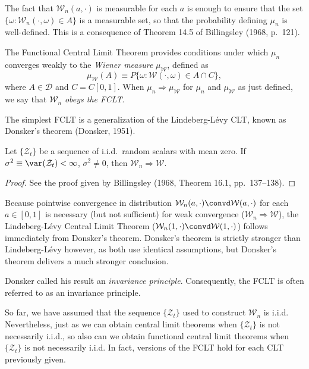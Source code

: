 The fact that $\mathcal{W}_n(a, \cdot)$ is measurable for each $a$ is enough to ensure that the set $\{\omega : \mathcal{W}_n(\cdot, \omega) \in A\}$ is a measurable set, so that the probability defining $\mu_n$ is well-defined. This is a consequence of Theorem 14.5 of Billingsley (1968, p.\ 121).

The Functional Central Limit Theorem provides conditions under which $\mu_n$ converges weakly to the \emph{Wiener measure} $\mu_{\mathcal{W}}$, defined as
\[
\mu_{\mathcal{W}}(A) \equiv P\{\omega : \mathcal{W}(\cdot, \omega) \in A \cap C\},
\]
where $A \in \mathcal{D}$ and $C = C[0,1]$. When $\mu_n \Rightarrow \mu_{\mathcal{W}}$ for $\mu_n$ and $\mu_{\mathcal{W}}$ as just defined, we say that $\mathcal{W}_n$ \emph{obeys the FCLT}.

The simplest FCLT is a generalization of the Lindeberg-L\'{e}vy CLT, known as Donsker's theorem (Donsker, 1951).

\begin{theorem}[Donsker]\label{thm:donsker}
Let $\{\mathcal{Z}_t\}$ be a sequence of i.i.d.\ random scalars with mean zero. If $\sigma^2 \equiv \var(\mathcal{Z}_t) < \infty$, $\sigma^2 \neq 0$, then $\mathcal{W}_n \Rightarrow \mathcal{W}$.
\end{theorem}

\begin{proof}
See the proof given by Billingsley (1968, Theorem 16.1, pp.\ 137--138).
\end{proof}

Because pointwise convergence in distribution $\mathcal{W}_n(a, \cdot) \convd \mathcal{W}(a, \cdot)$ for each $a \in [0,1]$ is necessary (but not sufficient) for weak convergence ($\mathcal{W}_n \Rightarrow \mathcal{W}$), the Lindeberg-L\'{e}vy Central Limit Theorem ($\mathcal{W}_n(1, \cdot) \convd \mathcal{W}(1, \cdot)$) follows immediately from Donsker's theorem. Donsker's theorem is strictly stronger than Lindeberg-L\'{e}vy however, as both use identical assumptions, but Donsker's theorem delivers a much stronger conclusion.

Donsker called his result an \emph{invariance principle}. Consequently, the FCLT is often referred to as an invariance principle.

So far, we have assumed that the sequence $\{\mathcal{Z}_t\}$ used to construct $\mathcal{W}_n$ is i.i.d. Nevertheless, just as we can obtain central limit theorems when $\{\mathcal{Z}_t\}$ is not necessarily i.i.d., so also can we obtain functional central limit theorems when $\{\mathcal{Z}_t\}$ is not necessarily i.i.d. In fact, versions of the FCLT hold for each CLT previously given.

